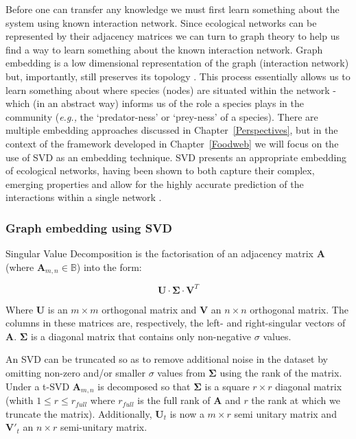 Before one can transfer any knowledge we must first learn something about the system using known interaction network. Since ecological networks can be represented by their adjacency matrices we can turn to graph theory to help us find a way to learn something about the known interaction network. Graph embedding is a low dimensional representation of the graph (interaction network) but, importantly, still preserves its topology \cite{Yan2005Graph}. This process essentially allows us to learn something about where species (nodes) are situated within the network - which (in an abstract way) informs us of the role a species plays in the community (\emph{e.g.,} the `predator-ness' or `prey-ness' of a species). There are multiple embedding approaches discussed in Chapter~\ref{Perspectives}, but in the context of the framework developed in Chapter~\ref{Foodweb} we will focus on the use of SVD as an embedding technique. SVD presents an appropriate embedding of ecological networks, having been shown to both capture their complex, emerging properties \cite{Strydom2021SvdEnt} and allow for the highly accurate prediction of the interactions within a single network \cite{Poisot2021ImpMam}.

\subsubsection{Graph embedding using SVD}

Singular Value Decomposition \cite{Forsythe1967ComSol, Golub1971SinVal} 
is the factorisation of an adjacency matrix \(\mathbf{A}\) (where
\(\mathbf{A}_{m,n} \in\mathbb{B}\)) into the form:

\[ \mathbf{U}\cdot\mathbf{\Sigma}\cdot\mathbf{V}^T \]

Where \(\mathbf{U}\) is an \(m \times m\) orthogonal matrix and
\(\mathbf{V}\) an \(n \times n\) orthogonal matrix. The columns in these
matrices are, respectively, the left- and right-singular vectors of
\(\mathbf{A}\). \(\mathbf{\Sigma}\) is a diagonal matrix that contains
only non-negative \(\sigma\) values.
 
An SVD can be truncated so as to remove additional noise in the dataset by
omitting non-zero and/or smaller \(\sigma\) values from
\(\mathbf{\Sigma}\) using the rank of the matrix. Under a t-SVD
\(\mathbf{A}_{m,n}\) is decomposed so that \(\mathbf{\Sigma}\) is a
square \(r \times r\) diagonal matrix (whith \(1 \le r \le r_{full}\)
where \(r_{full}\) is the full rank of \(\mathbf{A}\) and \(r\) the rank
at which we truncate the matrix). Additionally, \(\mathbf{U}_{t}\) is now a
\(m \times r\) semi unitary matrix and \(\mathbf{V}'_{t}\) an \(n \times r\)
semi-unitary matrix.

